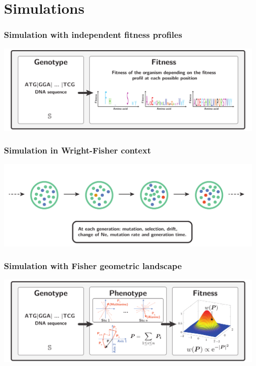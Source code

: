 \documentclass{article}
\begin{document}
\part*{Simulations}

\section{Simulation with independent fitness profiles}
\begin{center}
	\includegraphics[width=165mm] {artworks/ModelSimuDiv.pdf}
\end{center}

\section{Simulation in Wright-Fisher context}
\begin{center}
	\includegraphics[width=165mm] {artworks/ModelSimuPoly.pdf}
\end{center}

\section{Simulation with Fisher geometric landscape}
\begin{center}
	\includegraphics[width=165mm] {artworks/ModelSimuGeo.pdf}
\end{center}
\end{document}
